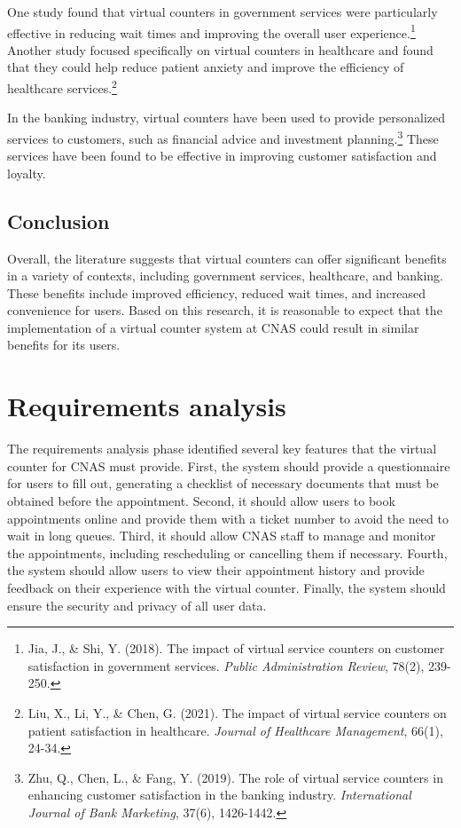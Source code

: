 One study found that virtual counters in government services were particularly effective in reducing wait times and improving the overall user experience.\footnote{Jia, J., \& Shi, Y. (2018). The impact of virtual service counters on customer satisfaction in government services. \textit{Public Administration Review}, 78(2), 239-250.} Another study focused specifically on virtual counters in healthcare and found that they could help reduce patient anxiety and improve the efficiency of healthcare services.\footnote{Liu, X., Li, Y., \& Chen, G. (2021). The impact of virtual service counters on patient satisfaction in healthcare. \textit{Journal of Healthcare Management}, 66(1), 24-34.}

In the banking industry, virtual counters have been used to provide personalized services to customers, such as financial advice and investment planning.\footnote{Zhu, Q., Chen, L., \& Fang, Y. (2019). The role of virtual service counters in enhancing customer satisfaction in the banking industry. \textit{International Journal of Bank Marketing}, 37(6), 1426-1442.} These services have been found to be effective in improving customer satisfaction and loyalty.
\subsection{Conclusion}
Overall, the literature suggests that virtual counters can offer significant benefits in a variety of contexts, including government services, healthcare, and banking. These benefits include improved efficiency, reduced wait times, and increased convenience for users. Based on this research, it is reasonable to expect that the implementation of a virtual counter system at CNAS could result in similar benefits for its users.
\newpage
\section{Requirements analysis}
The requirements analysis phase identified several key features that the virtual counter for CNAS must provide. First, the system should provide a questionnaire for users to fill out, generating a checklist of necessary documents that must be obtained before the appointment. Second, it should allow users to book appointments online and provide them with a ticket number to avoid the need to wait in long queues. Third, it should allow CNAS staff to manage and monitor the appointments, including rescheduling or cancelling them if necessary. Fourth, the system should allow users to view their appointment history and provide feedback on their experience with the virtual counter. Finally, the system should ensure the security and privacy of all user data. 
\medskip 

